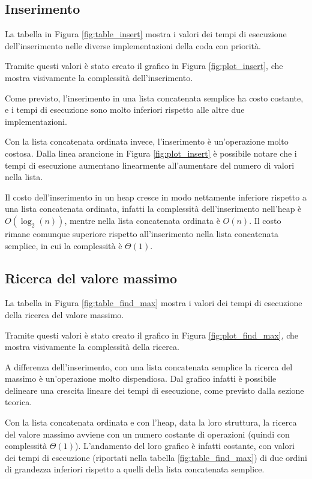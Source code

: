 \documentclass{article}
\begin{document}
\subsection{Inserimento}

La tabella in Figura \ref{fig:table_insert} mostra i valori dei tempi di esecuzione dell'inserimento nelle diverse implementazioni della coda con priorità.

Tramite questi valori è stato creato il grafico in Figura \ref{fig:plot_insert}, che mostra visivamente la complessità dell'inserimento.

\vspace{5pt}
Come previsto, l'inserimento in una lista concatenata semplice ha costo costante, e i tempi di esecuzione sono molto inferiori rispetto alle altre due implementazioni.

\vspace{5pt}
Con la lista concatenata ordinata invece, l'inserimento è un'operazione molto costosa. Dalla linea arancione in Figura \ref{fig:plot_insert} è possibile notare che i tempi di esecuzione aumentano linearmente all'aumentare del numero di valori nella lista.

\vspace{5pt}
Il costo dell'inserimento in un heap cresce in modo nettamente inferiore rispetto a una lista concatenata ordinata, infatti la complessità dell'inserimento nell'heap è $O(\log_2(n))$, mentre nella lista concatenata ordinata è $O(n)$.
Il costo rimane comunque superiore rispetto all'inserimento nella lista concatenata semplice, in cui la complessità è $\Theta(1)$.

\subsection{Ricerca del valore massimo}

La tabella in Figura \ref{fig:table_find_max} mostra i valori dei tempi di esecuzione della ricerca del valore massimo.

Tramite questi valori è stato creato il grafico in Figura \ref{fig:plot_find_max}, che mostra visivamente la complessità della ricerca.

\vspace{5pt}
A differenza dell'inserimento, con una lista concatenata semplice la ricerca del massimo è un'operazione molto dispendiosa. Dal grafico infatti è possibile delineare una crescita lineare dei tempi di esecuzione, come previsto dalla sezione teorica.

\vspace{5pt}
Con la lista concatenata ordinata e con l'heap, data la loro struttura, la ricerca del valore massimo avviene con un numero costante di operazioni (quindi con complessità $\Theta(1)$). L'andamento del loro grafico è infatti costante, con valori dei tempi di esecuzione (riportati nella tabella \ref{fig:table_find_max}) di due ordini di grandezza inferiori rispetto a quelli della lista concatenata semplice.
\end{document}
